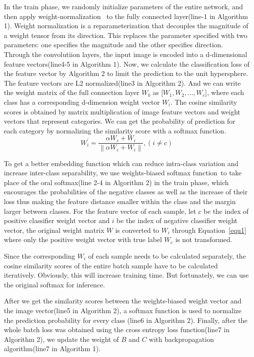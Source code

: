 \documentclass[runningheads]{llncs}
\begin{document}
In the train phase, we randomly initialize parameters of the entire network, and then apply weight-normalization~\cite{salimans2016weight} to the fully connected layer(line-1 in Algorithm 1). Weight normalization is a reparameterization that decouples the magnitude of a weight tensor from its direction. This replaces the parameter specified with two parameters: one specifies the magnitude and the other specifies direction. Through the convolutiion layers, the input image is encoded into a d-dimensional feature vectors(line4-5 in Algorithm 1). Now, we calculate the classification loss of the feature vector by Algorithm 2 to limit the prediction to the unit hypersphere. The feature vectors are L2 normalized(line3 in Algorithm 2). And we can write the weight matrix of the full connection layer $W_{b}$ as [$W_{1},W_{2},...,W_{c}$], where each class has a corresponding d-dimension weight vector $W_{i}$. The cosine similarity scores is obtained by matrix multiplication of image feature vectors and weight vectors that represent categories. We can get the probability of prediction for each category by normalizing the similarity score with a softmax function.
\begin{equation}
\label{equ1}
W_{i}^{'}=\frac{\alpha W_{c}+W_{i}}{\left\|\alpha W_{c}+W_{i}\right\|},(i\neq c)
\end{equation}

To get a better embedding function which can reduce intra-class variation and increase inter-class separability, we use weights-biased softmax function~\cite{li2019learning}to take place of the oral softmax(line 2-4 in Algorithm 2) in the train phase, which encourages the probabilities of the negative classes as well as the increase of their loss thus making the feature distance smaller within the class and the margin larger between classes. For the feature vector of each sample, let $c$ be the index of positive classifier weight vector and $i$ be the index of negative classifier weight vector, the original weight matrix $W$ is converted to $W_{i}$ through Equation~\ref{equ1} where only the positive weight vector with true label $W_{c}$ is not transformed.

Since the corresponding $W_{i}$ of each sample needs to be calculated separately, the cosine similarity scores of the entire batch sample have to be calculated iteratively. Obviously, this will increase training time. But fortunately, we can use the original softmax for inference.

After we get the similarity scores between the weights-biased weight vector and the image vector(line5 in Algorithm 2), a softmax function is used to normalize the prediction probability for every class (line6 in Algorithm 2). Finally, after the whole batch loss was obtained using the cross entropy loss function(line7 in Algorithm 2), we update the weight of $B$ and $C$ with backpropagation algorithm(line7 in Algorithm 1).
\end{document}
